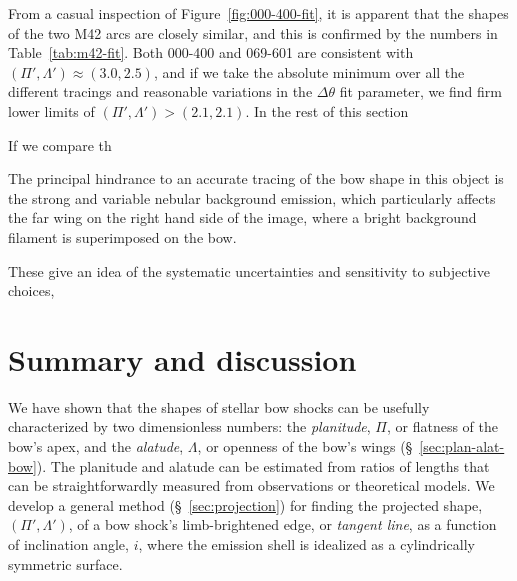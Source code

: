From a casual inspection of Figure~\ref{fig:000-400-fit}, it is
apparent that the shapes of the two M42 arcs are closely similar, and
this is confirmed by the numbers in Table~\ref{tab:m42-fit}. Both
000-400 and 069-601 are consistent with
\((\Pi', \Lambda') \approx (3.0, 2.5)\), and if we take the absolute minimum over
all the different tracings and reasonable variations in the
\(\Delta\theta\) fit parameter, we find firm lower limits of
\((\Pi', \Lambda') > (2.1, 2.1)\).  In the rest of this section


If we compare th



The principal hindrance to an accurate tracing of the bow shape in
this object is the strong and variable nebular background emission,
which particularly affects the far wing on the right hand side of the
image, where a bright background filament is superimposed on the bow.

These give an idea of the systematic uncertainties and sensitivity to
subjective choices,

\section{Summary and discussion}
\label{sec:conc}

We have shown that the shapes of stellar bow shocks can be usefully
characterized by two dimensionless numbers: the \textit{planitude},
\(\Pi\), or flatness of the bow's apex, and the \textit{alatude},
\(\Lambda\), or openness of the bow's wings (\S~\ref{sec:plan-alat-bow}).
The planitude and alatude can be estimated from ratios of lengths that
can be straightforwardly measured from observations or theoretical
models.  We develop a general method (\S~\ref{sec:projection}) for
finding the projected shape, \((\Pi', \Lambda')\), of a bow shock's
limb-brightened edge, or \textit{tangent line}, as a function of
inclination angle, \(i\), where the emission shell is idealized as a
cylindrically symmetric surface.

